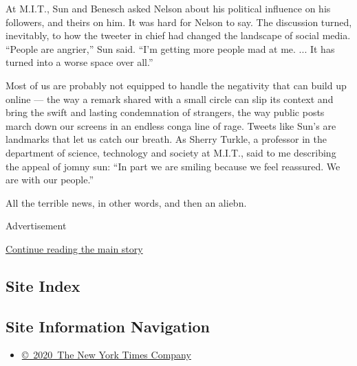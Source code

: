 At M.I.T., Sun and Benesch asked Nelson about his political influence on
his followers, and theirs on him. It was hard for Nelson to say. The
discussion turned, inevitably, to how the tweeter in chief had changed
the landscape of social media. ``People are angrier,'' Sun said. ``I'm
getting more people mad at me. ... It has turned into a worse space over
all.''

Most of us are probably not equipped to handle the negativity that can
build up online --- the way a remark shared with a small circle can slip
its context and bring the swift and lasting condemnation of strangers,
the way public posts march down our screens in an endless conga line of
rage. Tweets like Sun's are landmarks that let us catch our breath. As
Sherry Turkle, a professor in the department of science, technology and
society at M.I.T., said to me describing the appeal of jomny sun: ``In
part we are smiling because we feel reassured. We are with our people.''

All the terrible news, in other words, and then an aliebn.

Advertisement

\protect\hyperlink{after-bottom}{Continue reading the main story}

\hypertarget{site-index}{%
\subsection{Site Index}\label{site-index}}

\hypertarget{site-information-navigation}{%
\subsection{Site Information
Navigation}\label{site-information-navigation}}

\begin{itemize}
\tightlist
\item
  \href{https://help.nytimes3xbfgragh.onion/hc/en-us/articles/115014792127-Copyright-notice}{©~2020~The
  New York Times Company}
\end{itemize}

